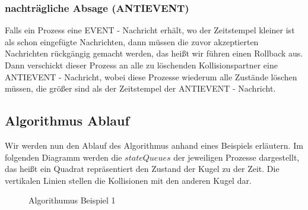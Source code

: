 \documentclass[a4paper, 10pt, openright, parskip, chapterprefix]{scrreprt}
\begin{document}
\subsubsection*{nachträgliche Absage (ANTIEVENT)} 

Falls ein Prozess eine EVENT - Nachricht erhält, wo der Zeitstempel kleiner ist als schon eingefügte Nachrichten, dann müssen die zuvor akzeptierten Nachrichten rückgängig gemacht werden, das heißt wir führen einen Rollback aus. Dann verschickt dieser Prozess an alle zu löschenden Kollisionspartner eine ANTIEVENT - Nachricht, wobei diese Prozesse wiederum alle Zustände löschen müssen, die größer sind als der Zeitstempel der ANTIEVENT - Nachricht. 

\subsection{Algorithmus Ablauf}
Wir werden nun den Ablauf des Algorithmus anhand eines Beispiels erläutern. Im folgenden Diagramm  werden die $stateQueues$ der jeweiligen Prozesse dargestellt, das heißt ein Quadrat repräsentiert den Zustand der Kugel zu der Zeit. Die vertikalen Linien stellen die Kollisionen mit den anderen Kugel dar. 

\begin{figure}[h!]
\centering{}
\caption{Algorithumus Beispiel 1}
\label{abb:bsp1}
\end{figure}
\end{document}
